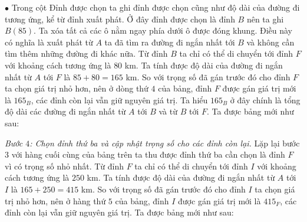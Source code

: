 \begin{multicols}{2}
	\vskip 0.1cm
	$\bullet$ Trong cột Đỉnh được chọn ta ghi đỉnh được chọn cũng như độ dài của đường đi tương ứng, kể từ đỉnh xuất phát. Ở đây đỉnh được chọn là đỉnh $B$ nên ta ghi $B(85)$.
	\vskip 0.1cm
	Ta xóa tất cả các ô nằm ngay phía dưới ô được đóng khung. Điều này có nghĩa là xuất phát từ $A$ ta đã tìm ra đường đi ngắn nhất tới $B$ và không cần tìm thêm những đường đi khác nữa. 
	\vskip 0.1cm
	Từ đỉnh $B$ ta chỉ có thể di chuyển tới đỉnh $F$ với khoảng cách tương ứng là $80$ km. Ta tính được độ dài của đường đi ngắn nhất từ $A$ tới $F$ là $85+80=165$ km. So với trọng số đã gán trước đó cho đỉnh $F$ ta chọn giá trị nhỏ hơn, nên ở dòng thứ $4$ của bảng, đỉnh $F$ được gán giá trị mới là $165_B$, các đỉnh còn lại vẫn giữ nguyên giá trị. Ta hiểu $165_B$ ở đây chính là tổng độ dài các đường đi ngắn nhất từ $A$ tới $B$ và từ $B$ tới $F$.
	\vskip 0.1cm 
	Ta được bảng mới như sau: 
	\begin{table}[H]
		\vspace*{-10pt}
		\centering
		\captionsetup{labelformat= empty, justification=centering}
		\vspace*{-10pt}
	\end{table}
	\textit{Bước $4$: Chọn đỉnh thứ ba và cập nhật trọng số cho các đỉnh còn lại.}  Lặp lại bước $3$ với hàng cuối cùng của bảng trên ta thu được đỉnh thứ ba cần chọn là đỉnh $F$ vì có trọng số nhỏ nhất. Từ đỉnh $F$ ta chỉ có thể di chuyển tới đỉnh $I$ với khoảng cách tương ứng là $250$ km. Ta tính được độ dài của đường đi ngắn nhất từ $A$ tới $I$ là $165+250=415$ km. So với trọng số đã gán trước đó cho đỉnh $I$ ta chọn giá trị nhỏ hơn, nên ở hàng thứ $5$ của bảng, đỉnh $I$ được gán giá trị mới là $415_F$, các đỉnh còn lại vẫn giữ nguyên giá trị. 
	\vskip 0.1cm
	Ta được bảng mới như sau: 
	\begin{table}[H]

\end{table}
\end{multicols}
